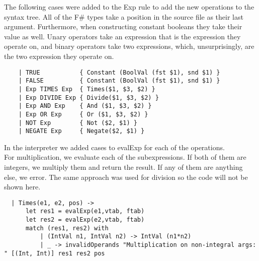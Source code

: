 The following cases were added to the Exp rule to add the new operations to the syntax tree. All of the F\# types take a position in the source file as their last argument. Furthermore, when constructing constant booleans they take their value as well. Unary operators take an expression that is the expression they operate on, and binary operators take two expressions, which, unsurprisingly, are the two expression they operate on.
\begin{verbatim}
    | TRUE           { Constant (BoolVal (fst $1), snd $1) }
    | FALSE          { Constant (BoolVal (fst $1), snd $1) }
    | Exp TIMES Exp  { Times($1, $3, $2) }
    | Exp DIVIDE Exp { Divide($1, $3, $2) }
    | Exp AND Exp    { And ($1, $3, $2) }
    | Exp OR Exp     { Or ($1, $3, $2) }
    | NOT Exp        { Not ($2, $1) }
    | NEGATE Exp     { Negate($2, $1) }
 \end{verbatim} 


In the interpreter we added cases to evalExp for each of the operations. \\

For multiplication, we evaluate each of the subexpressions. If both of them are integers, we multiply them and return the result. If any of them are anything else, we error. The same approach was used for division so the code will not be shown here.
\begin{verbatim}
  | Times(e1, e2, pos) ->
      let res1 = evalExp(e1,vtab, ftab)
      let res2 = evalExp(e2,vtab, ftab)
      match (res1, res2) with
          | (IntVal n1, IntVal n2) -> IntVal (n1*n2)
          | _ -> invalidOperands "Multiplication on non-integral args: " [(Int, Int)] res1 res2 pos
\end{verbatim}

\begin{comment}
  | Divide(e1, e2, pos) ->
      let res1 = evalExp(e1,vtab, ftab)
      let res2 = evalExp(e2,vtab, ftab)
      match (res1, res2) with
          | (IntVal n1, IntVal n2) -> IntVal (n1/n2)
          | _ -> invalidOperands "Division on non-integral args: " [(Int, Int)] res1 res2 pos
\end{comment}
~\\

